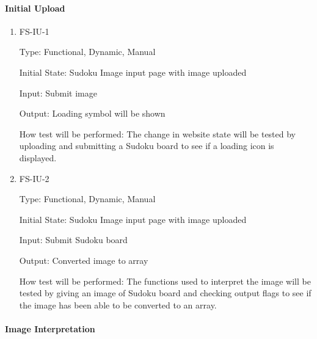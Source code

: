\documentclass[11pt]{article}
\begin{document}
\paragraph{Initial Upload}

\begin{enumerate}

\item{FS-IU-1\\}

Type: Functional, Dynamic, Manual
					
Initial State: Sudoku Image input page with image uploaded
					
Input: Submit image
					
Output: Loading symbol will be shown
					
How test will be performed: The change in website state will be tested by uploading and submitting a Sudoku board to see if a loading icon is displayed.
					
\item{FS-IU-2\\}

Type: Functional, Dynamic, Manual
					
Initial State: Sudoku Image input page with image uploaded
					
Input: Submit Sudoku board
					
Output: Converted image to array
					
How test will be performed: The functions used to interpret the image will be tested by giving an image of Sudoku board and checking output flags to see if the image has been able to be converted to an array.

\end{enumerate}

\paragraph{Image Interpretation}
\end{document}
